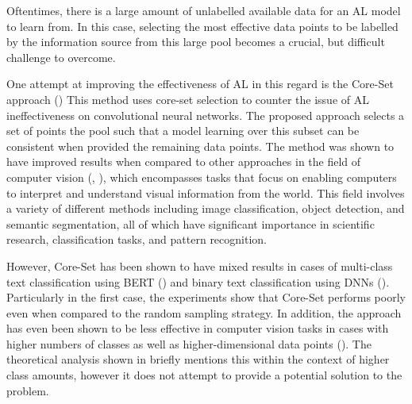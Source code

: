 \documentclass[english,bachelor,lu]{webisthesis} %
\begin{document}
Oftentimes, there is a large amount of unlabelled available data for an AL model to learn from. In this case, selecting the most effective data points to be labelled by the information source from this large pool becomes a crucial, but difficult challenge to overcome. 

One attempt at improving the effectiveness of AL in this regard is the Core-Set approach (\cite{DBLP:conf/iclr/SenerS18}) This method uses core-set selection to counter the issue of AL ineffectiveness on convolutional neural networks. The proposed approach selects a set of points the pool such that a model learning over this subset can be consistent when provided the remaining data points. The method was shown to have improved results when compared to other approaches in the field of computer vision (\cite{DBLP:conf/iclr/SenerS18}, \cite{DBLP:conf/cvpr/CaramalauBK21}), which encompasses tasks that focus on enabling computers to interpret and understand visual information from the world. This field involves a variety of different methods including image classification, object detection, and semantic segmentation, all of which have significant importance in scientific research, classification tasks, and pattern recognition.

However, Core-Set has been shown to have mixed results in cases of multi-class text classification using BERT (\cite{DBLP:conf/kdd/0002MM21}) and binary text classification using DNNs (\cite{DBLP:conf/cikm/Liu0LZW21}). Particularly in the first case, the experiments show that Core-Set performs poorly even when compared to the random sampling strategy. In addition, the approach has even been shown to be less effective in computer vision tasks in cases with higher numbers of classes as well as higher-dimensional data points (\cite{DBLP:conf/iccv/SinhaED19}). The theoretical analysis shown in \cite{DBLP:conf/iclr/SenerS18} briefly mentions this within the context of higher class amounts, however it does not attempt to provide a potential solution to the problem.

\end{document}
